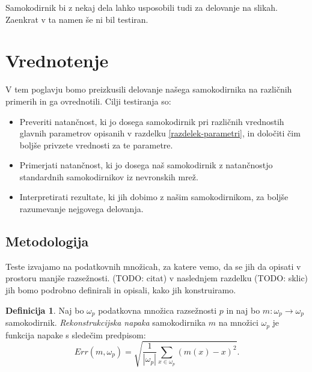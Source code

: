 \documentclass[12pt,a4paper,twoside]{article}
\theoremstyle{definition} %
\newtheorem{definicija}{Definicija}[section]
\theoremstyle{plain} %
\numberwithin{equation}{section}  %
\begin{document}
Samokodirnik bi z nekaj dela lahko usposobili tudi za delovanje na slikah.
Zaenkrat v ta namen še ni bil testiran.


\section{Vrednotenje}

V tem poglavju bomo preizkusili delovanje našega samokodirnika na različnih primerih in ga ovrednotili.
Cilji testiranja so:
\begin{itemize}
	\item Preveriti natančnost, ki jo dosega samokodirnik pri različnih vrednostih glavnih parametrov opisanih v razdelku \ref{razdelek-parametri}, 
	in določiti čim boljše privzete vrednosti za te parametre.

	\item Primerjati natančnost, ki jo dosega naš samokodirnik z natančnostjo standardnih samokodirnikov iz nevronskih mrež.

	\item Interpretirati rezultate, ki jih dobimo z našim samokodirnikom, za boljše razumevanje nejgovega delovanja.
\end{itemize}


\subsection{Metodologija}

Teste izvajamo na podatkovnih množicah, za katere vemo, da se jih da opisati v prostoru manjše razsežnosti. (TODO: citat) %
v naslednjem razdelku (TODO: sklic) jih bomo podrobno definirali in opisali, kako jih konstruiramo.


\begin{definicija}
	Naj bo $\omega_p$ podatkovna množica razsežnosti $p$ in naj bo $m: \omega_p \rightarrow \omega_p$ samokodirnik.
	\emph{Rekonstrukcijska napaka} samokodirnika $m$ na množici $\omega_p$ je funkcija napake s sledečim predpisom:
	\[
		Err(m,\omega_p) = \sqrt{\frac{1}{|\omega_p|} \sum_{x \in \omega_p} (m(x)-x)^2}.
	\]
\end{definicija}	
\end{document}
